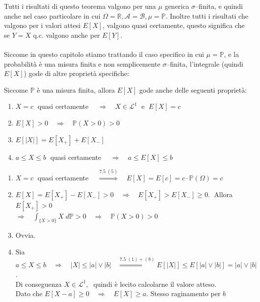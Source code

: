 Tutti i risultati di questo teorema valgono per una $\mu$ generica $\sigma$--finita, e quindi anche nel caso particolare in cui $\Omega = \mathbb{R}, \mathcal{A}=\mathcal{B}, \mu=\mathbb{P}$. Inoltre tutti i risultati che valgono per i valori attesi $E[X]$, valgono quasi certamente, questo significa che se $Y = X$ q.c. valgono anche per $E[Y]$.\\
\\
Siccome in questo capitolo stiamo trattando il caso specifico in cui $\mu = \mathbb{P}$, e la probabilità è una misura finita e non semplicemente  $\sigma$--finita, l'integrale (quindi $E[X]$) gode di altre proprietà specifiche:

\begin{corollario}
\label{cor:7.6}
    Siccome $\mathbb{P}$ è una misura finita, allora $E[X]$ gode anche delle seguenti proprietà:
    \begin{enumerate}
        \item [8.] $X = c\;$ quasi certamente $\quad \Rightarrow\quad X\in\mathcal{L}^1\;$ e $\;E[X] = c$
        \item [9.] $E[X]>0 \quad \Rightarrow\quad \mathbb{P}(X>0) >0$
        \item [10.] $E[|X|] = E[X_+] + E[X_-]$
        \item [11.]$ a\leq X\leq b\;$ quasi certamente $\quad \Rightarrow\quad a\leq E[X]\leq b$
    \end{enumerate}
    
    \begin{dimostrazione}
        \begin{enumerate}
        \item [8.] $X = c\;$ quasi certamente $\quad \overset{7.5\;(5)}{\Rightarrow}\quad E[X] = E[c] = c\cdot\mathbb{P}(\Omega) = c$
        \item [9.] $E[X] = E[X_+] - E[X_-]>0\quad \Rightarrow\quad E[X_+]>E[X_-]\geq0.\;$ Allora $E[X_+]>0$\\$\Rightarrow\quad\int_{\{X>0\}}X\;d\mathbb{P}>0\quad \Rightarrow\quad \mathbb{P}(X>0)>0$
        \item [10.] Ovvia.
        \item [11.] Sia  $a\leq X\leq b\quad \Rightarrow\quad |X|\leq |a| \vee |b| \quad \overset{7.5\;(1)+(8)}{\Rightarrow} E[|X|] \leq E\left[|a| \vee |b|\right] = |a| \vee |b|$.\\
        Di conseguenza $X\in\mathcal{L}^1,\;$ quindi è lecito calcolarne il valore atteso. \\
        Dato che $E[X-a]\geq 0 \quad \Rightarrow\quad E[X]\geq a$. Stesso raginamento per $b$
    \end{enumerate}
    \end{dimostrazione}
\end{corollario}

